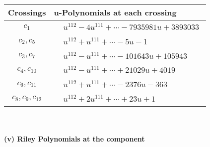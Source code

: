 \documentclass[1p]{elsarticle_modified}
\theoremstyle{definition}
\begin{document}
\begin{tabular}{m{50pt}|m{274pt}}
Crossings & \hspace{64pt}u-Polynomials at each crossing \\
\hline $$\begin{aligned}c_{1}\end{aligned}$$&$\begin{aligned}
&u^{112}-4 u^{111}+\cdots-7935981 u+3893033
\end{aligned}$\\
\hline $$\begin{aligned}c_{2},c_{5}\end{aligned}$$&$\begin{aligned}
&u^{112}+u^{111}+\cdots-5 u-1
\end{aligned}$\\
\hline $$\begin{aligned}c_{3},c_{7}\end{aligned}$$&$\begin{aligned}
&u^{112}- u^{111}+\cdots-101643 u+105943
\end{aligned}$\\
\hline $$\begin{aligned}c_{4},c_{10}\end{aligned}$$&$\begin{aligned}
&u^{112}- u^{111}+\cdots+21029 u+4019
\end{aligned}$\\
\hline $$\begin{aligned}c_{6},c_{11}\end{aligned}$$&$\begin{aligned}
&u^{112}+u^{111}+\cdots-2376 u-363
\end{aligned}$\\
\hline $$\begin{aligned}c_{8},c_{9},c_{12}\end{aligned}$$&$\begin{aligned}
&u^{112}+2 u^{111}+\cdots+23 u+1
\end{aligned}$\\
\hline
\end{tabular}\\~\\
\newpage\renewcommand{\arraystretch}{1}
\flushleft \textbf{(v) Riley Polynomials at the component}\newline \\
\end{document}

